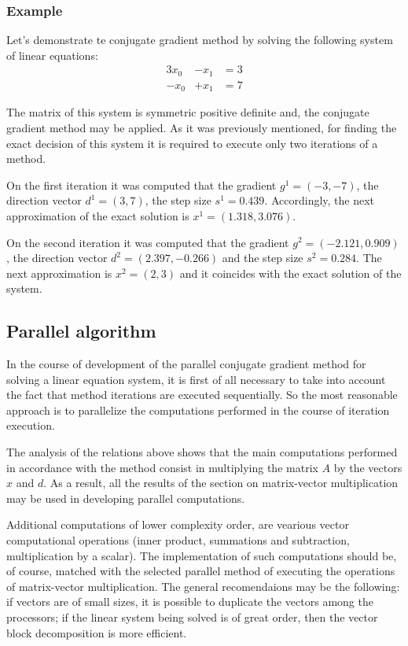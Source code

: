 \subsubsection{Example} %
\label{ssub:example}

Let’s demonstrate te conjugate gradient method by solving the following system of linear equations:
\begin{align}
    3x_0 &- x_1 &= 3  \nonumber\\
    -x_0 &+ x_1 &= 7   \nonumber
\end{align}

The matrix of this system is symmetric positive definite and, the conjugate gradient method may be applied. As it was previously mentioned, for finding the exact decision of this system it is required to execute only two iterations of a method.

On the first iteration it was computed that the gradient $g^1 = (-3,-7)$, the direction vector $d^1 = (3, 7)$, the step size $s^1 =0.439$. Accordingly, the next approximation of the exact solution is $x^1 = (1.318, 3.076)$.

On the second iteration it was computed that the gradient $g^2 = (-2.121, 0.909)$, the direction vector $d^2 = (2.397,- 0.266)$ and the step size $s^2 =0.284$. The next approximation is $x^2 = (2, 3)$ and it coincides with the exact solution of the system.

\subsection{Parallel algorithm} %
\label{sub:parallel_algorithm}
In the course of development of the parallel conjugate gradient method for solving a linear equation system, it is first of all necessary to take into account the fact that method iterations are executed sequentially. So the most reasonable approach is to parallelize the computations performed in the course of iteration execution.

The analysis of the relations above shows that the main computations performed in accordance with the method consist in multiplying the matrix $A$ by the vectors $x$ and $d$. As a result, all the results of the section on matrix-vector multiplication may be used in developing parallel computations.

Additional computations of lower complexity order, are vearious vector computational operations (inner product, summations and subtraction, multiplication by a scalar). The implementation of such computations should be, of course, matched with the selected parallel method of executing the operations of matrix-vector multiplication. The general recomendaions may be the following: if vectors are of small sizes, it is possible to duplicate the vectors among the processors; if the linear system being solved is of great order, then the vector block decomposition is more efficient.

